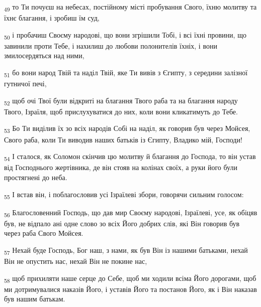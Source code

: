 \begin{tcolorbox}
\textsubscript{49} то Ти почуєш на небесах, постійному місті пробування Свого, їхню молитву та їхнє благання, і зробиш їм суд,
\end{tcolorbox}
\begin{tcolorbox}
\textsubscript{50} і пробачиш Своєму народові, що вони згрішили Тобі, і всі їхні провини, що завинили проти Тебе, і нахилиш до любови полонителів їхніх, і вони змилосердяться над ними,
\end{tcolorbox}
\begin{tcolorbox}
\textsubscript{51} бо вони народ Твій та наділ Твій, яке Ти вивів з Єгипту, з середини залізної гутничої печі,
\end{tcolorbox}
\begin{tcolorbox}
\textsubscript{52} щоб очі Твої були відкриті на благання Твого раба та на благання народу Твого, Ізраїля, щоб прислухуватися до них, коли вони кликатимуть до Тебе.
\end{tcolorbox}
\begin{tcolorbox}
\textsubscript{53} Бо Ти виділив їх зо всіх народів Собі на наділ, як говорив був через Мойсея, Свого раба, коли Ти виводив наших батьків із Єгипту, Владико мій, Господи!
\end{tcolorbox}
\begin{tcolorbox}
\textsubscript{54} І сталося, як Соломон скінчив цю молитву й благання до Господа, то він устав від Господнього жертівника, де він стояв на колінах своїх, а руки його були простягнені до неба.
\end{tcolorbox}
\begin{tcolorbox}
\textsubscript{55} І встав він, і поблагословив усі Ізраїлеві збори, говорячи сильним голосом:
\end{tcolorbox}
\begin{tcolorbox}
\textsubscript{56} Благословенний Господь, що дав мир Своєму народові, Ізраїлеві, усе, як обіцяв був, не відпало ані одне слово зо всіх Його добрих слів, які Він говорив був через раба Свого Мойсея.
\end{tcolorbox}
\begin{tcolorbox}
\textsubscript{57} Нехай буде Господь, Бог наш, з нами, як був Він із нашими батьками, нехай Він не опустить нас, нехай Він не покине нас,
\end{tcolorbox}
\begin{tcolorbox}
\textsubscript{58} щоб прихиляти наше серце до Себе, щоб ми ходили всіма Його дорогами, щоб ми дотримувалися наказів Його, і уставів Його та постанов Його, як і Він наказав був нашим батькам.
\end{tcolorbox}
